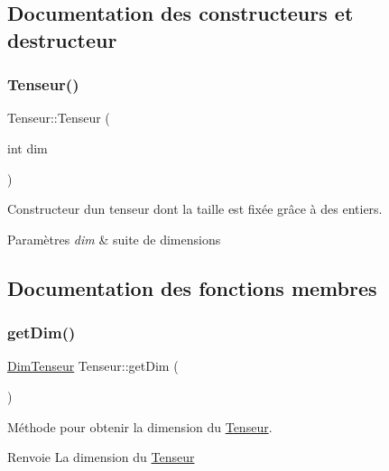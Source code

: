 \subsection{Documentation des constructeurs et destructeur}
\mbox{\label{classTenseur_a936de784ba6d02e78456091b857c90d2}} 
\subsubsection{\texorpdfstring{Tenseur()}{Tenseur()}}
{\footnotesize\ttfamily Tenseur\+::\+Tenseur (\begin{DoxyParamCaption}\item[{int}]{dim }\end{DoxyParamCaption})}



Constructeur d\textquotesingle{}un tenseur dont la taille est fixée grâce à des entiers. 


\begin{DoxyParams}{Paramètres}
{\em dim} & suite de dimensions \\
\hline
\end{DoxyParams}


\subsection{Documentation des fonctions membres}
\mbox{\label{classTenseur_a84d2bb71deb6f4998327f6c9309c1ed4}} 
\subsubsection{\texorpdfstring{get\+Dim()}{getDim()}}
{\footnotesize\ttfamily \hyperlink{classDimTenseur}{Dim\+Tenseur} Tenseur\+::get\+Dim (\begin{DoxyParamCaption}{ }\end{DoxyParamCaption})}



Méthode pour obtenir la dimension du \hyperlink{classTenseur}{Tenseur}. 

\begin{DoxyReturn}{Renvoie}
La dimension du \hyperlink{classTenseur}{Tenseur} 
\end{DoxyReturn}
\mbox{\label{classTenseur_abf24ad6abb135909d0ec82142da47188}} 
